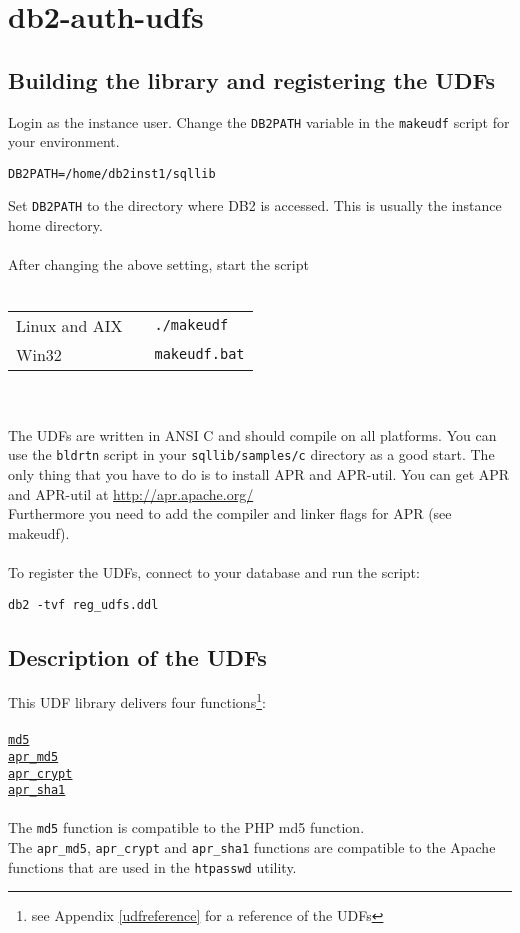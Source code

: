 \documentclass[11pt,a4paper]{article}
\begin{document}
\section{db2-auth-udfs}
\subsection{Building the library and registering the UDFs}
Login as the instance user. Change the {\tt DB2PATH} variable in the {\tt makeudf} script for your environment.
\begin{verbatim}
DB2PATH=/home/db2inst1/sqllib
\end{verbatim}
Set {\tt DB2PATH} to the directory where DB2 is accessed. This is usually the instance home directory.\\
\\
After changing the above setting, start the script\\
\\
\begin{tabular}{@{} lll @{}}
Linux and AIX & & {\tt ./makeudf}\\
Win32         & & {\tt makeudf.bat}\\
\end{tabular}
\\\\
The UDFs are written in ANSI C and should compile on all platforms.
You can use the {\tt bldrtn} script in your {\tt sqllib/samples/c} directory as a good start.
The only thing that you have to do is to install APR and \mbox{APR-util}.
You can get APR and APR-util at \url{http://apr.apache.org/} \\
Furthermore you need to add the compiler and linker flags for APR (see makeudf).\\
\\
To register the UDFs, connect to your database and run the script:
\begin{verbatim}
db2 -tvf reg_udfs.ddl
\end{verbatim}
\subsection{Description of the UDFs}
This UDF library delivers four functions\footnote{see Appendix \ref{udfreference} for a reference of the UDFs}:\\
\\
\hyperlink{hmd5}{\tt md5}\\
\hyperlink{haprmd5}{\tt apr\_md5}\\
\hyperlink{haprcrypt}{\tt apr\_crypt}\\
\hyperlink{haprsha1}{\tt apr\_sha1}\\
\\
The {\tt md5} function is compatible to the PHP md5 function.\\
The {\tt apr\_md5}, {\tt apr\_crypt} and {\tt apr\_sha1} functions are compatible to the Apache functions that are used in the {\tt htpasswd} utility.
\end{document}
